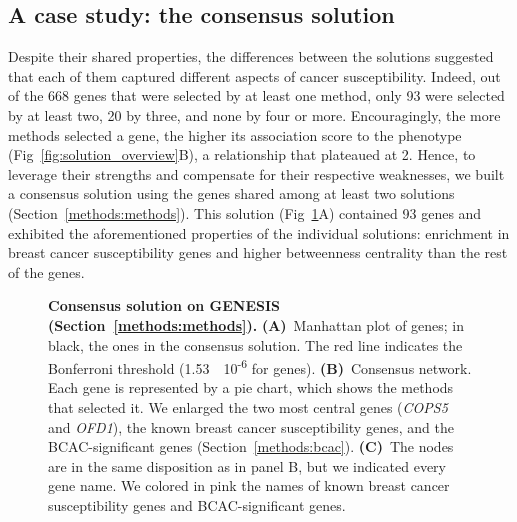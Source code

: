 \documentclass[10pt,letterpaper]{article}
\begin{document}
\subsection{A case study: the consensus solution}
\label{results:consensus}

Despite their shared properties, the differences between the solutions suggested that each of them captured different aspects of cancer susceptibility. Indeed, out of the 668 genes that were selected by at least one method, only 93 were selected by at least two, 20 by three, and none by four or more. Encouragingly, the more methods selected a gene, the higher its association score to the phenotype (Fig~\ref{fig:solution_overview}B), a relationship that plateaued at 2. Hence, to leverage their strengths and compensate for their respective weaknesses, we built a consensus solution using the genes shared among at least two solutions (Section~\ref{methods:methods}). This solution (Fig~\ref{fig:consensus}A) contained 93 genes and exhibited the aforementioned properties of the individual solutions: enrichment in breast cancer susceptibility genes and higher betweenness centrality than the rest of the genes. 

\begin{figure}[!ht]
  \centering
  \caption{ \textbf{Consensus solution on GENESIS (Section~\ref{methods:methods}).} \textbf{(A)}~Manhattan plot of genes; in black, the ones in the consensus solution. The red line indicates the Bonferroni threshold (1.53~\texttimes{}~10\textsuperscript{-6} for genes). \textbf{(B)}~Consensus network. Each gene is represented by a pie chart, which shows the methods that selected it. We enlarged the two most central genes (\emph{COPS5} and \emph{OFD1}), the known breast cancer susceptibility genes, and the BCAC-significant genes (Section~\ref{methods:bcac}). \textbf{(C)}~The nodes are in the same disposition as in panel B, but we indicated every gene name. We colored in pink the names of known breast cancer susceptibility genes and BCAC-significant genes.}
  \label{fig:consensus}
\end{figure}
\end{document}

